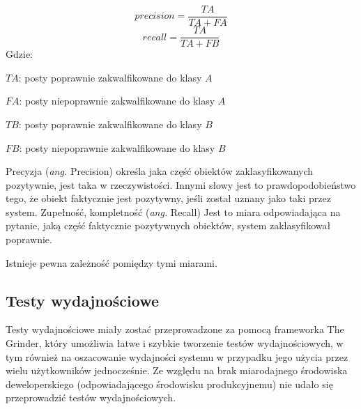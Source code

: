 \documentclass[runningheads]{llncs}
\begin{document}
\begin{equation}
	precision = \frac{TA}{TA + FA}
\end{equation}
\begin{equation}
	recall = \frac{TA}{TA + FB}
\end{equation}
Gdzie: 

	$TA$: posty poprawnie zakwalfikowane do klasy $A$
	
	$FA$: posty niepoprawnie zakwalfikowane do klasy $A$
	
	$TB$: posty poprawnie zakwalfikowane do klasy $B$
	
	$FB$: posty niepoprawnie zakwalfikowane do klasy $B$
	
Precyzja (\textit{ang.} Precision)  określa jaka część obiektów
zaklasyfikowanych pozytywnie, jest taka  w rzeczywistości. Innymi słowy jest to
prawdopodobieństwo tego, że obiekt faktycznie jest  pozytywny, jeśli został
uznany jako taki przez system.
Zupełność, kompletność (\textit{ang.} Recall) Jest to miara odpowiadająca na
pytanie, jaką część faktycznie pozytywnych obiektów, system zaklasyfikował poprawnie.

Istnieje pewna zależność pomiędzy tymi miarami. 


\subsection{Testy wydajnościowe}
Testy wydajnościowe miały zostać przeprowadzone  za pomocą frameworka The
Grinder, który 
umożliwia łatwe i szybkie  tworzenie  testów wydajnościowych, w tym również
na oszacowanie wydajności systemu w przypadku  jego użycia przez wielu
użytkowników jednocześnie. Ze względu na brak miarodajnego środowiska
deweloperskiego (odpowiadającego środowisku produkcyjnemu) nie udało się
przeprowadzić testów wydajnościowych.

\clearpage
\end{document}
